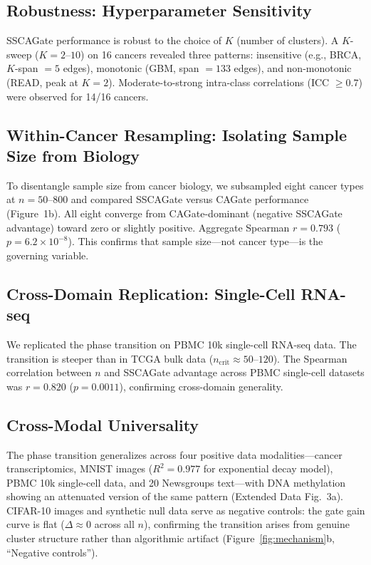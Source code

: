 \documentclass[12pt,a4paper]{article}
\begin{document}
\subsection{Robustness: Hyperparameter Sensitivity}

SSCAGate performance is robust to the choice of $K$ (number of clusters). A $K$-sweep ($K = 2$--$10$) on 16 cancers revealed three patterns: insensitive (e.g., BRCA, $K$-span $= 5$ edges), monotonic (GBM, span $= 133$ edges), and non-monotonic (READ, peak at $K=2$). Moderate-to-strong intra-class correlations (ICC $\geq 0.7$) were observed for 14/16 cancers.

\subsection{Within-Cancer Resampling: Isolating Sample Size from Biology}

To disentangle sample size from cancer biology, we subsampled eight cancer types at $n = 50$--$800$ and compared SSCAGate versus CAGate performance (Figure~1b). All eight converge from CAGate-dominant (negative SSCAGate advantage) toward zero or slightly positive. Aggregate Spearman $r = 0.793$ ($p = 6.2 \times 10^{-8}$). This confirms that sample size---not cancer type---is the governing variable.



\subsection{Cross-Domain Replication: Single-Cell RNA-seq}

We replicated the phase transition on PBMC 10k single-cell RNA-seq data. The transition is steeper than in TCGA bulk data ($n_{\text{crit}} \approx 50$--$120$). The Spearman correlation between $n$ and SSCAGate advantage across PBMC single-cell datasets was $r = 0.820$ ($p = 0.0011$), confirming cross-domain generality.

\subsection{Cross-Modal Universality}

The phase transition generalizes across four positive data modalities---cancer transcriptomics, MNIST images ($R^2 = 0.977$ for exponential decay model), PBMC 10k single-cell data, and 20 Newsgroups text---with DNA methylation showing an attenuated version of the same pattern (Extended Data Fig.~3a). CIFAR-10 images and synthetic null data serve as negative controls: the gate gain curve is flat ($\Delta \approx 0$ across all $n$), confirming the transition arises from genuine cluster structure rather than algorithmic artifact (Figure~\ref{fig:mechanism}b, ``Negative controls'').
\end{document}
